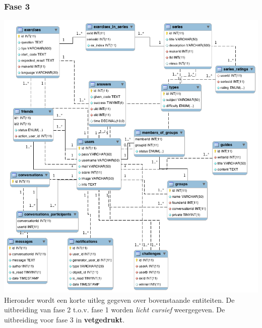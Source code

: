 \subsubsection{Fase 3}
\mbox{\hspace{-6ex}\includegraphics[keepaspectratio=true, scale=0.5]{raport_files/design/UML3.png}}\\
\small Hieronder wordt een korte uitleg gegeven over bovenstaande entiteiten. De uitbreiding van fase 2 t.o.v. fase 1
worden \textsl{licht cursief} weergegeven. De uitbreiding voor fase 3 in \textbf{vetgedrukt}.
\normalsize
